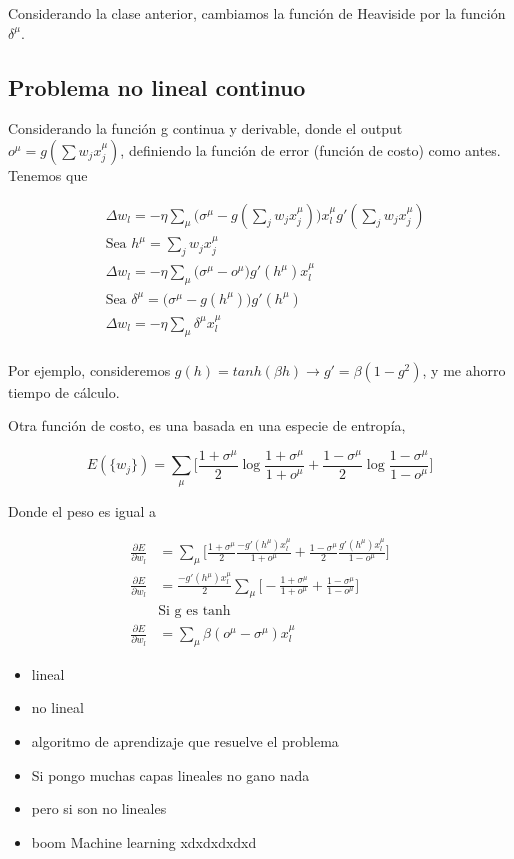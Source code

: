 Considerando la clase anterior, cambiamos la función de Heaviside por la función $\delta ^\mu$.


\subsection{Problema no lineal continuo}

Considerando la función g continua y derivable, donde el output $o^\mu = g(\sum w_j x_j^\mu)$, definiendo la función de error (función de costo) como antes. Tenemos que

\begin{align}
    &\Delta w_l = -\eta \sum_\mu \bigg( \sigma ^ \mu - g(\sum_j w_jx_j^\mu)\bigg) x^\mu_l g'(\sum_j w_jx_j^\mu)\\
    &\text{Sea }h^\mu = \sum_j w_jx_j^\mu \\
    &\Delta w_l = -\eta \sum_\mu \bigg( \sigma ^ \mu - o^\mu\bigg) g'(h^\mu)  x^\mu_l\\
    &\text{Sea }\delta^\mu =  \bigg( \sigma ^ \mu - g(h^\mu)\bigg) g'(h^\mu)\\
    &\Delta w_l = -\eta \sum_\mu \delta^\mu  x^\mu_l\\
\end{align}

Por ejemplo, consideremos $g(h)=tanh(\beta h) \rightarrow g' = \beta (1-g^2)$, y me ahorro tiempo de cálculo.

Otra función de costo, es una basada en una especie de entropía, 

\begin{equation}
	E(\{ w_j \}) = \sum_\mu \bigg[  \frac{1+\sigma^\mu}{2} \log{\frac{1+\sigma^\mu}{1+o^\mu}} + \frac{1-\sigma^\mu}{2} \log{\frac{1-\sigma^\mu}{1-o^\mu}}  \bigg]
\end{equation}

Donde el peso es igual a 

\begin{align}
	\frac{\partial E}{\partial w_l} &=  \sum _\mu \bigg[  \frac{1+\sigma^\mu}{2} {\frac{-g'(h^\mu) x^\mu_l}{1+o^\mu}} + \frac{1-\sigma^\mu}{2} {\frac{g'(h^\mu) x^\mu_l}{1-o^\mu}}  \bigg]\\
	\frac{\partial E}{\partial w_l} &=  \frac{-g'(h^\mu) x^\mu_l}{2}\sum _\mu \bigg[  -\frac{1+\sigma^\mu}{1+o^\mu} + \frac{1-\sigma^\mu}{1-o^\mu} \bigg]\\
	&\text{Si g es tanh}\\
		\frac{\partial E}{\partial w_l} &= \sum_\mu \beta (o^\mu - \sigma^\mu) x_l^\mu
\end{align}


\begin{itemize}
	\item lineal
	\item no lineal
	\item algoritmo de aprendizaje que resuelve el problema
	\item Si pongo muchas capas lineales no gano nada
	\item pero si son no lineales
	\item boom Machine learning xdxdxdxdxd
\end{itemize}


